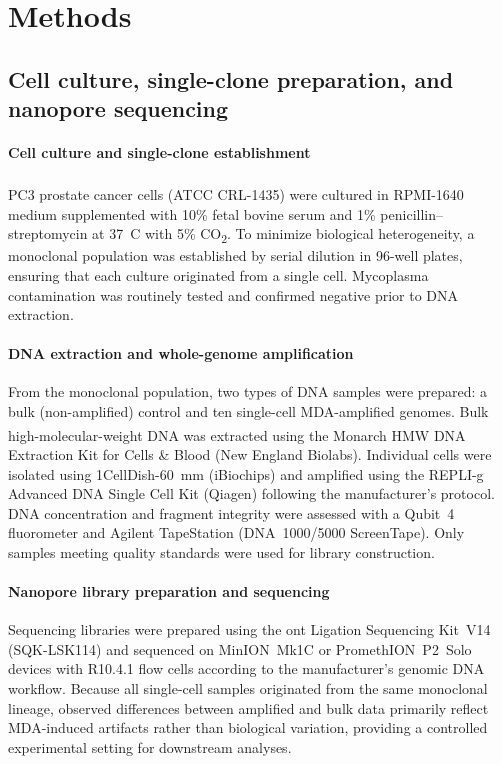 \documentclass[pdflatex,sn-nature,lineno]{sn-jnl}%
\theoremstyle{thmstyleone}%
\theoremstyle{thmstyletwo}%
\theoremstyle{thmstylethree}%
\begin{document}
\section*{Methods}\label{sec:methods}

\subsection*{Cell culture, single-clone preparation, and nanopore sequencing}

\paragraph{Cell culture and single-clone establishment}
PC3 prostate cancer cells (ATCC\textsuperscript{\textregistered} CRL-1435\texttrademark) were cultured in RPMI-1640 medium supplemented with 10\% fetal bovine serum and 1\% penicillin--streptomycin at 37~\textdegree C with 5\% CO\textsubscript{2}. To minimize biological heterogeneity, a monoclonal population was established by serial dilution in 96-well plates, ensuring that each culture originated from a single cell. Mycoplasma contamination was routinely tested and confirmed negative prior to DNA extraction.

\paragraph{DNA extraction and whole-genome amplification}
From the monoclonal population, two types of DNA samples were prepared: a bulk (non-amplified) control and ten single-cell MDA-amplified genomes. Bulk high-molecular-weight DNA was extracted using the Monarch\textsuperscript{\textregistered} HMW DNA Extraction Kit for Cells \& Blood (New England Biolabs). Individual cells were isolated using 1CellDish-60~mm (iBiochips) and amplified using the REPLI-g Advanced DNA Single Cell Kit (Qiagen) following the manufacturer's protocol. DNA concentration and fragment integrity were assessed with a Qubit~4 fluorometer and Agilent TapeStation (DNA~1000/5000 ScreenTape). Only samples meeting quality standards were used for library construction.

\paragraph{Nanopore library preparation and sequencing}
Sequencing libraries were prepared using the \gls{ont} Ligation Sequencing Kit~V14 (SQK-LSK114) and sequenced on MinION~Mk1C or PromethION~P2~Solo devices with R10.4.1 flow cells according to the manufacturer's genomic DNA workflow. Because all single-cell samples originated from the same monoclonal lineage, observed differences between amplified and bulk data primarily reflect MDA-induced artifacts rather than biological variation, providing a controlled experimental setting for downstream analyses.
\end{document}
